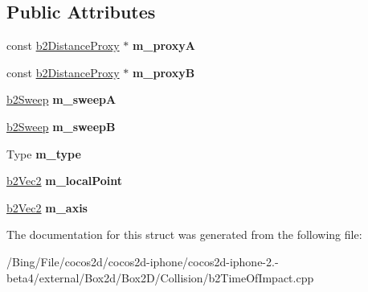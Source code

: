 \subsection*{Public Attributes}
\begin{DoxyCompactItemize}
\item 
\hypertarget{structb2_separation_function_a5c03d798e97cd653aa7db390275bf9a7}{const \hyperlink{structb2_distance_proxy}{b2\-Distance\-Proxy} $\ast$ {\bfseries m\-\_\-proxy\-A}}\label{structb2_separation_function_a5c03d798e97cd653aa7db390275bf9a7}

\item 
\hypertarget{structb2_separation_function_a25fc938e03bf77ac276b17b24e52958f}{const \hyperlink{structb2_distance_proxy}{b2\-Distance\-Proxy} $\ast$ {\bfseries m\-\_\-proxy\-B}}\label{structb2_separation_function_a25fc938e03bf77ac276b17b24e52958f}

\item 
\hypertarget{structb2_separation_function_a46b838a661baa40cde771b779c2ff341}{\hyperlink{structb2_sweep}{b2\-Sweep} {\bfseries m\-\_\-sweep\-A}}\label{structb2_separation_function_a46b838a661baa40cde771b779c2ff341}

\item 
\hypertarget{structb2_separation_function_a11ba433f6e524fb92390bd8b4dd376b6}{\hyperlink{structb2_sweep}{b2\-Sweep} {\bfseries m\-\_\-sweep\-B}}\label{structb2_separation_function_a11ba433f6e524fb92390bd8b4dd376b6}

\item 
\hypertarget{structb2_separation_function_a51075eff2de404a1d82eee831fdfd4af}{Type {\bfseries m\-\_\-type}}\label{structb2_separation_function_a51075eff2de404a1d82eee831fdfd4af}

\item 
\hypertarget{structb2_separation_function_ab77a17de0f5c708212090f599ec1795e}{\hyperlink{structb2_vec2}{b2\-Vec2} {\bfseries m\-\_\-local\-Point}}\label{structb2_separation_function_ab77a17de0f5c708212090f599ec1795e}

\item 
\hypertarget{structb2_separation_function_a767b8fc4174d200ae8fb1d2bfba3407b}{\hyperlink{structb2_vec2}{b2\-Vec2} {\bfseries m\-\_\-axis}}\label{structb2_separation_function_a767b8fc4174d200ae8fb1d2bfba3407b}

\end{DoxyCompactItemize}


The documentation for this struct was generated from the following file\-:\begin{DoxyCompactItemize}
\item 
/\-Bing/\-File/cocos2d/cocos2d-\/iphone/cocos2d-\/iphone-\/2.-\/beta4/external/\-Box2d/\-Box2\-D/\-Collision/b2\-Time\-Of\-Impact.\-cpp\end{DoxyCompactItemize}
